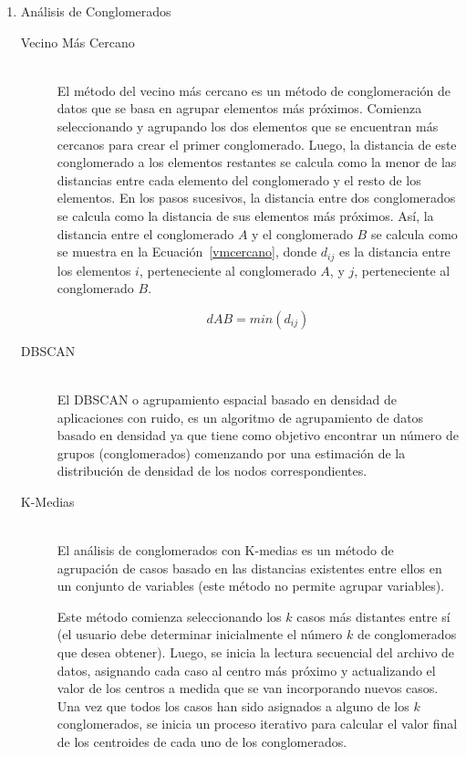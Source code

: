 \begin{enumerate}
\begin{description}
    \end{description}
    
    
  \item Análisis de Conglomerados
    \begin{description}
    
      \item[Vecino Más Cercano] \hfill \\
     El método del vecino más cercano es un método de conglomeración de datos que se basa en agrupar elementos más próximos. Comienza seleccionando y agrupando los dos elementos que se encuentran más cercanos para crear el primer conglomerado. Luego, la distancia de este conglomerado a los elementos restantes se calcula como la menor de las distancias entre cada elemento del conglomerado y el resto de los elementos. En los pasos sucesivos, la distancia entre dos conglomerados se calcula como la distancia de sus elementos más próximos. Así, la distancia entre el conglomerado $A$ y el conglomerado $B$ se calcula como se muestra en la Ecuación~\ref{vmcercano}, donde $d_{ij}$ es la distancia entre los elementos $i$, perteneciente al conglomerado $A$, y $j$, perteneciente al conglomerado $B$.
     
     \begin{equation}\label{vmcercano}
     d{AB}=min(d_{ij})
     \end{equation}
      
      \item[DBSCAN] \hfill \\
      El DBSCAN o agrupamiento espacial basado en densidad de aplicaciones con ruido, es un algoritmo de agrupamiento de datos basado en densidad ya que tiene como objetivo encontrar un número de grupos (conglomerados) comenzando por una estimación de la distribución de densidad de los nodos correspondientes. 
      
      \item[K-Medias] \hfill \\
      El análisis de conglomerados con K-medias es un método de agrupación de casos basado en las distancias existentes entre ellos en un conjunto de variables (este método no permite agrupar variables).
      
      Este método comienza seleccionando los $k$ casos más distantes entre sí (el usuario debe determinar inicialmente el número $k$ de conglomerados que desea obtener). Luego, se inicia la lectura secuencial del archivo de datos, asignando cada caso al centro más próximo y actualizando el valor de los centros a medida que se van incorporando nuevos casos. Una vez que todos los casos han sido asignados a alguno de los $k$ conglomerados, se inicia un proceso iterativo para calcular el valor final de los centroides de cada uno de los conglomerados. 
      
    \end{description}
\end{enumerate}


